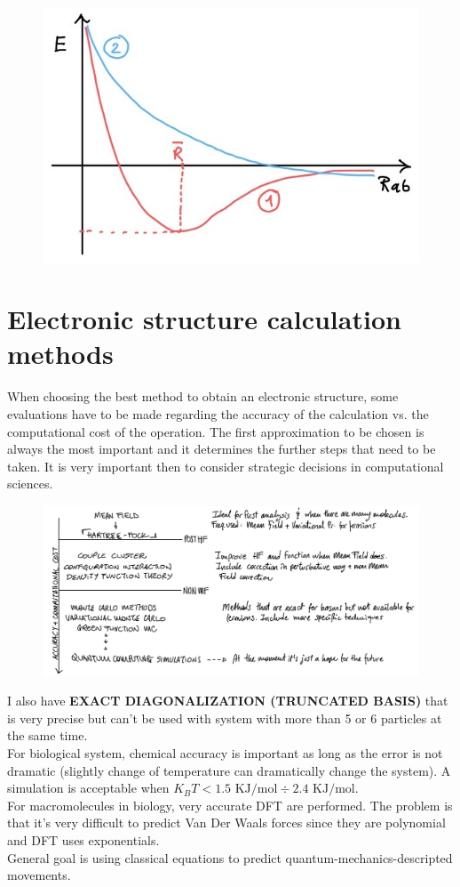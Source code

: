 \begin{figure}[htbp!]
	\centering
	\includegraphics[scale=0.30]{img_9}
\end{figure}
\section{Electronic structure calculation methods}
When choosing the best method to obtain an electronic structure, some evaluations have to be made regarding the accuracy of the calculation vs. the computational cost of the operation. The first approximation to be chosen is always the most important and it determines the further steps that need to be taken. It is very important then to consider strategic decisions in computational sciences.\\
\begin{figure}[htbp!]
	\centering
	\includegraphics[scale=0.30]{img_13}
\end{figure}
\newline
I also have \textbf{EXACT DIAGONALIZATION (TRUNCATED BASIS)} that is very precise but can't be used with system with more than 5 or 6 particles at the same time.\\
For biological system, chemical accuracy is important as long as the error is not dramatic (slightly change of temperature can dramatically change the system). A simulation is acceptable when $K_BT < 1.5\text{ KJ/mol} \div 2.4 \text{ KJ/mol}$.\\
For macromolecules in biology, very accurate DFT are performed. The problem is that it's very difficult to predict Van Der Waals forces since they are polynomial and DFT uses exponentials.\\
General goal is using classical equations to predict quantum-mechanics-descripted movements.\\
